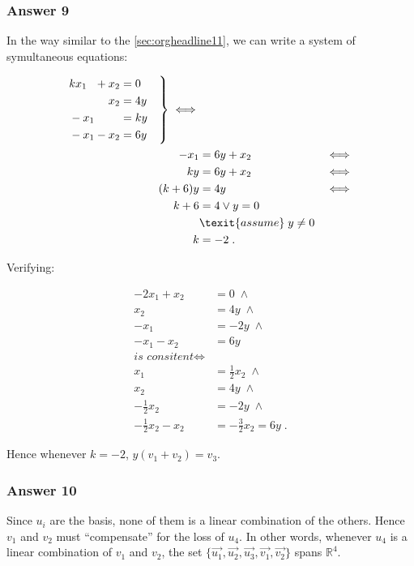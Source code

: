 \documentclass[11pt]{article}
\begin{document}
\subsubsection{Answer 9}
\label{sec:orgheadline12}
In the way similar to the \ref{sec:orgheadline11}, we can write a system of symultaneous
equations:

\begin{align*}
  \left.
  \begin{alignedat}{3}
    & kx_1 & {}+{} & x_2 & {}={} & 0 \\
    &  &           & x_2 & {}={} & 4y \\
    & -x_1 &       &     & {}={} & ky \\
    & -x_1 & {}-{} & x_2 & {}={} & 6y
  \end{alignedat} \quad \right\} \iff \\
  -x_1 &= 6y + x_2 &\iff \\
  ky   &= 6y + x_2 &\iff \\
  (k + 6)y &= 4y &\iff \\
  k + 6 &= 4 \lor y = 0 \\
  &\texit{assume}\; y \neq 0 \\
  k &= -2 \;.
\end{align*}

Verifying:

\begin{align*}
  -2x_1 + x_2 &=  0  \; \land \\
  x_2         &= 4y  \; \land \\
  -x_1        &= -2y \; \land \\
  -x_1 - x_2  &= 6y \\
  \textit{is consitent} \iff \\
  x_1                   &= \frac{1}{2}x_2 \; \land \\
  x_2                   &= 4y             \; \land \\
  -\frac{1}{2}x_2       &= -2y            \; \land \\
  -\frac{1}{2}x_2 - x_2 &= -\frac{3}{2}x_2 = 6y \;.
\end{align*}

Hence whenever \(k = -2\), \(y(v_1+v_2)=v_3\).

\subsubsection{Answer 10}
\label{sec:orgheadline13}
Since \(u_i\) are the basis, none of them is a linear combination of the
others.  Hence \(v_1\) and \(v_2\) must ``compensate'' for the loss of \(u_4\).
In other words, whenever \(u_4\) is a linear combination of \(v_1\) and \(v_2\),
the set \(\{\vec{u_1}, \vec{u_2}, \vec{u_3}, \vec{v_1}, \vec{v_2}\}\) spans
\(\mathbb{R}^4\).
\end{document}
